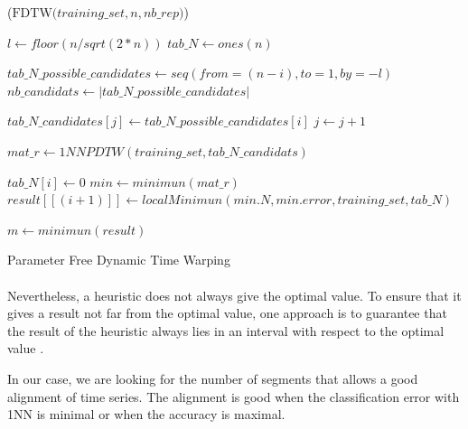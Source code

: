 \begin{algorithm}[h]
\DontPrintSemicolon
{}

\Begin($\text{FDTW} {(} training\_set, n, nb\_rep {)}$)
{
  $l \leftarrow floor(n/sqrt(2 * n))$\;
  $tab\_N \leftarrow ones(n)$\;
  {
    $tab\_N\_possible\_candidates \leftarrow seq(from = (n - i), to = 1, by = -l)$\;
    $nb\_candidats \leftarrow |tab\_N\_possible\_candidates|$\;

    {
      {
       $tab\_N\_candidates[j] \leftarrow tab\_N\_possible\_candidates[i] $\;
       $j \leftarrow j + 1$
      }

    }
    $mat\_r \leftarrow 1NNPDTW(training\_set, tab\_N\_candidats)$ \;


    {
        $tab\_N[i] \leftarrow 0 $
    }
    $min \leftarrow minimun(mat\_r) $\;
    $result[[(i + 1)]]   \leftarrow localMinimun(min.N,  min.error, training\_set,
    tab\_N)$\;
      
  }
  $m \leftarrow minimun(result)$\;
    

}
\caption{Parameter Free Dynamic Time Warping}\label{algo5}
\end{algorithm}

\paragraph{}Nevertheless, a heuristic does not always give the optimal value. To ensure that
it gives a result not far from the optimal value, one approach is to
 guarantee that the result of the heuristic always lies in an interval with respect to the optimal
value \cite{ibarra1975fast}.

In our case, we are looking for the number of segments that allows a good
alignment of time series. The alignment is good when the classification error
with 1NN is minimal or when the accuracy is maximal.

